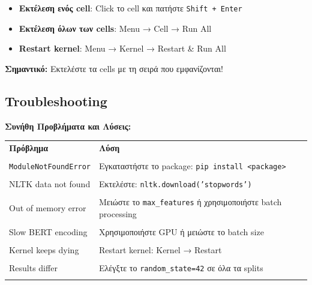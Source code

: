 \documentclass[12pt,a4paper,twoside]{book}
\begin{document}
\begin{itemize}
    \item \textbf{Εκτέλεση ενός cell}: Click το cell και πατήστε \texttt{Shift + Enter}
    \item \textbf{Εκτέλεση όλων των cells}: Menu → Cell → Run All
    \item \textbf{Restart kernel}: Menu → Kernel → Restart \& Run All
\end{itemize}

\textbf{Σημαντικό:} Εκτελέστε τα cells με τη σειρά που εμφανίζονται!

\subsection{Troubleshooting}

\textbf{Συνήθη Προβλήματα και Λύσεις:}

\begin{table}[H]
    \centering
    \small
    \begin{tabular}{p{5cm}p{7cm}}
        \hline
        \textbf{Πρόβλημα}            & \textbf{Λύση}                                                       \\\\
        \hline
        \texttt{ModuleNotFoundError} & Εγκαταστήστε το package: \texttt{pip install <package>}             \\\\
        \hline
        NLTK data not found          & Εκτελέστε: \texttt{nltk.download('stopwords')}                      \\\\
        \hline
        Out of memory error          & Μειώστε το \texttt{max\_features} ή χρησιμοποιήστε batch processing \\\\
        \hline
        Slow BERT encoding           & Χρησιμοποιήστε GPU ή μειώστε το batch size                          \\\\
        \hline
        Kernel keeps dying           & Restart kernel: Kernel → Restart                                    \\\\
        \hline
        Results differ               & Ελέγξτε το \texttt{random\_state=42} σε όλα τα splits               \\\\
        \hline
    \end{tabular}
\end{table}
\end{document}
